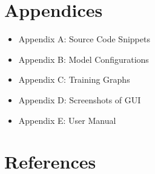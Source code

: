 \documentclass[
  12pt,
  oneside]{article}
\providecommand{\tightlist}{%
  \setlength{\itemsep}{0pt}\setlength{\parskip}{0pt}}
\begin{document}
\newpage

\section{Appendices}\label{appendices}

\begin{itemize}
\tightlist
\item
  Appendix A: Source Code Snippets
\item
  Appendix B: Model Configurations
\item
  Appendix C: Training Graphs
\item
  Appendix D: Screenshots of GUI
\item
  Appendix E: User Manual
\end{itemize}

\newpage

\section*{References}\label{references}
\end{document}
